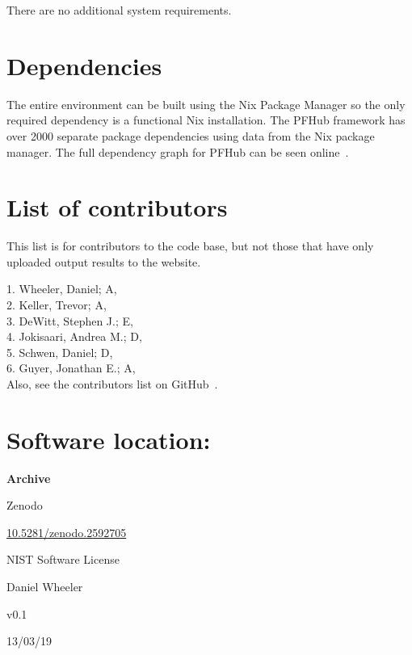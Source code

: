 \documentclass{jors}
\begin{document}
There are no additional system requirements.

\section*{Dependencies}

The entire environment can be built using the Nix Package Manager so
the only required dependency is a functional Nix installation. The
PFHub framework has over 2000 separate package dependencies using
data from the Nix package manager. The full dependency graph for PFHub
can be seen online~\cite{dependencies}.

\section*{List of contributors}

This list is for contributors to the code base, but not those that
have only uploaded output results to the website.

1. Wheeler, Daniel; A,  \\
2. Keller, Trevor; A,  \\
3. DeWitt, Stephen J.; E,  \\
4. Jokisaari, Andrea M.; D,  \\
5. Schwen, Daniel; D,  \\
6. Guyer, Jonathan E.; A,  \\

Also, see the contributors list on GitHub~\cite{contributors}.

\section*{Software location:}

{\bf Archive}

\begin{description}[noitemsep,topsep=0pt]
	\item[Name:] Zenodo
	\item[Persistent identifier:]
          \href{https://dx.doi.org/10.5281/zenodo.2592705}{10.5281/zenodo.2592705}
	\item[Licence:] NIST Software License~\cite{nistlicense}
	\item[Publisher:]  Daniel Wheeler
	\item[Version published:] v0.1
	\item[Date published:] 13/03/19
\end{description}
\end{document}
